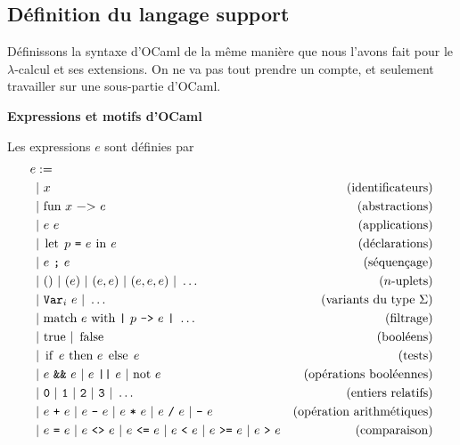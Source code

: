 \documentclass[11pt]{article}
\begin{document}
\subsection{Définition du langage support}

Définissons la syntaxe d'OCaml de la même manière que nous l'avons fait pour le $\lambda$-calcul et ses extensions. On ne va pas tout prendre un compte, et seulement travailler sur une sous-partie d'OCaml.

\begin{definition}
    \textbf{Expressions et motifs d'OCaml}
    
    Les expressions $e$ sont définies par
    \begin{equation*}
    \begin{aligned}
        e &:=\\
        &|~x&\text{(identificateurs)}\\
        &|~\text{\lstinline|fun|}~x~\text{\lstinline|->|}~e&\text{(abstractions)}\\
        &|~e~e&\text{(applications)}\\
        &|~\text{\lstinline|let|}~p~\verb|=|~e~\text{\lstinline|in|}~e&\text{(déclarations)}\\
        &|~e~\verb|;|~e&\text{(séquençage)}\\
        &|~()~|~(e)~|~(e, e)~|~(e, e, e)~|~\dots&\text{($n$-uplets)}\\
        &|~\verb|Var|_i~e~|~\dots&\text{(variants  du type $\Sigma$)}\\
        &|~\text{\lstinline|match|}~e~\text{\lstinline|with|}~\verb!|!~p~\verb|->|~e~\verb!|!~\dots&\text{(filtrage)}\\
        &|~\text{\lstinline|true|}~|~\text{\lstinline|false|}&\text{(booléens)}\\
        &|~\text{\lstinline|if|}~e~\text{\lstinline|then|}~e~\text{\lstinline|else|}~e&\text{(tests)}\\
        &|~e~\verb|&&|~e~|~e~\verb!||!~e~|~\text{\lstinline|not|}~e&\text{(opérations booléennes)}\\
        &|~\verb|0|~|~\verb|1|~|~\verb|2|~|~\verb|3|~|~\dots&\text{(entiers relatifs)}\\
        &|~e~\verb|+|~e~|~e~\verb|-|~e~|~e~\verb|*|~ e~|~e~\verb|/|~e~|~\verb|-|~e&\text{(opération arithmétiques)}\\
        &|~e~\verb|=|~e~|~e~\verb|<>|~e~|~e~\verb|<=|~e~|~e~\verb|<|~e~|~e~\verb|>=|~e~|~e~\verb|>|~e&\text{(comparaison)}\\
    \end{aligned}
    \end{equation*}


\end{definition}
\end{document}
